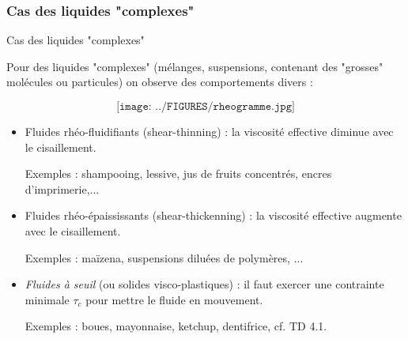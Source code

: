\subsubsection{Cas des liquides "complexes"}
\begin{frame}{Cas des liquides "complexes"}
\small
\bigskip

Pour des liquides "complexes" (mélanges, suspensions, contenant des "grosses" molécules ou particules) on observe des comportements divers :
\pause \smallskip


$$
\texttt{[image: ../FIGURES/rheogramme.jpg]}
$$

\pause \smallskip

\begin{itemize}

\item %
Fluides rhéo-fluidifiants (shear-thinning) : la viscosité effective diminue avec le cisaillement.

Exemples : shampooing, lessive, jus de fruits concentrés, encres d'imprimerie,...


\item 
Fluides rhéo-épaississants (shear-thickenning) : la viscosité effective augmente avec le cisaillement.


Exemples : maïzena, suspensions diluées de polymères, ...

\item {\em Fluides à seuil}  (ou solides visco-plastiques) :
il faut exercer une contrainte minimale $\tau_c$ pour mettre le fluide en mouvement.

Exemples : boues, mayonnaise, ketchup,  dentifrice, cf. TD 4.1.







\end{itemize}
\end{frame}
